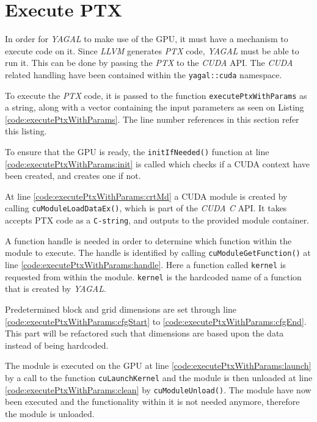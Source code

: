 \section{Execute PTX}

In order for \textit{YAGAL} to make use of the GPU, it must have a mechanism to execute code on it. Since \textit{LLVM} generates \textit{PTX} code, \textit{YAGAL} must be able to run it. This can be done by passing the \textit{PTX} to the \textit{CUDA} API. The \textit{CUDA} related handling have been contained within the \texttt{yagal::cuda} namespace. 

To execute the \textit{PTX} code, it is passed to the function \texttt{executePtxWithParams} as a string, along with a vector containing the input parameters as seen on Listing \ref{code:executePtxWithParams}. The line number references in this section refer this listing.

To ensure that the GPU is ready, the \texttt{initIfNeeded()} function at line \ref{code:executePtxWithParams:init} is called which checks if a CUDA context have been created, and creates one if not.

At line \ref{code:executePtxWithParams:crtMd} a CUDA module is created by calling \texttt{cuModuleLoadDataEx()}, which is part of the \textit{CUDA C} API. It takes accepts PTX code as a \texttt{C-string}, and outputs to the provided module container.

A function handle is needed in order to determine which function within the module to execute. The handle is identified by calling \texttt{cuModuleGetFunction()} at line \ref{code:executePtxWithParams:handle}. Here a function called \texttt{kernel} is requested from within the module. \texttt{kernel} is the hardcoded name of a function that is created by \textit{YAGAL}.

Predetermined block and grid dimensions are set through line \ref{code:executePtxWithParams:cfgStart} to \ref{code:executePtxWithParams:cfgEnd}. This part will be refactored such that dimensions are based upon the data instead of being hardcoded.

The module is executed on the GPU at line \ref{code:executePtxWithParams:launch} by a call to the function \texttt{cuLaunchKernel} and the module is then unloaded at line \ref{code:executePtxWithParams:clean} by \texttt{cuModuleUnload()}. The module have now been executed and the functionality within it is not needed anymore, therefore the module is unloaded.

